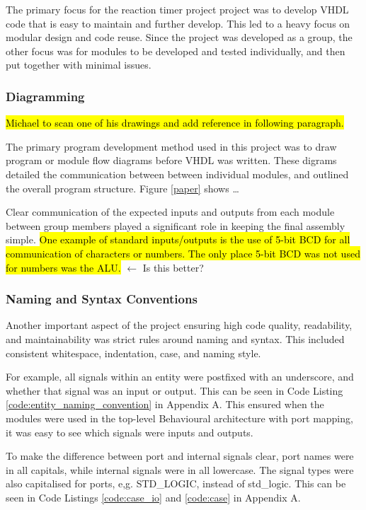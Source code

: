 \documentclass[11pt]{article}
\begin{document}
The primary focus for the reaction timer project project was to develop VHDL code that is easy to maintain and further develop. This led to a heavy focus on modular design and code reuse. Since the project was developed as a group, the other focus was for modules to be developed and tested individually, and then put together with minimal issues.

\subsubsection{Diagramming}

\hl{Michael to scan one of his drawings and add reference in following paragraph.}

The primary program development method used in this project was to draw program or module flow diagrams before VHDL was written. These digrams detailed the communication between between individual modules, and outlined the overall program structure. Figure \ref{paper} shows \dots

Clear communication of the expected inputs and outputs from each module between group members played a significant role in keeping the final assembly simple. \hl{One example of standard inputs/outputs is the use of 5-bit BCD for all communication of characters or numbers. The only place 5-bit BCD was not used for numbers was the ALU.} $\leftarrow$ Is this better?

\subsubsection{Naming and Syntax Conventions}

Another important aspect of the project ensuring high code quality, readability, and maintainability was strict rules around naming and syntax. This included consistent whitespace, indentation, case, and naming style. 

For example, all signals within an entity were postfixed with an underscore, and whether that signal was an input or output. This can be seen in Code Listing \ref{code:entity_naming_convention} in Appendix A. This ensured when the modules were used in the top-level Behavioural architecture with port mapping, it was easy to see which signals were inputs and outputs.

To make the difference between port and internal signals clear, port names were in all capitals, while internal signals were in all lowercase. The signal types were also capitalised for ports, e,g. STD\_LOGIC, instead of std\_logic. This can be seen in Code Listings \ref{code:case_io} and \ref{code:case} in Appendix A.
\end{document}
